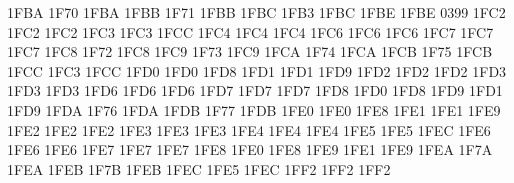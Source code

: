 \setcclcuc 1FBA 1F70 1FBA %
\setcclcuc 1FBB 1F71 1FBB %
\setcclcuc 1FBC 1FB3 1FBC %
\setcclcuc 1FBE 1FBE 0399 %
\setcclcuc 1FC2 1FC2 1FC2 %
\setcclcuc 1FC3 1FC3 1FCC %
\setcclcuc 1FC4 1FC4 1FC4 %
\setcclcuc 1FC6 1FC6 1FC6 %
\setcclcuc 1FC7 1FC7 1FC7 %
\setcclcuc 1FC8 1F72 1FC8 %
\setcclcuc 1FC9 1F73 1FC9 %
\setcclcuc 1FCA 1F74 1FCA %
\setcclcuc 1FCB 1F75 1FCB %
\setcclcuc 1FCC 1FC3 1FCC %
\setcclcuc 1FD0 1FD0 1FD8 %
\setcclcuc 1FD1 1FD1 1FD9 %
\setcclcuc 1FD2 1FD2 1FD2 %
\setcclcuc 1FD3 1FD3 1FD3 %
\setcclcuc 1FD6 1FD6 1FD6 %
\setcclcuc 1FD7 1FD7 1FD7 %
\setcclcuc 1FD8 1FD0 1FD8 %
\setcclcuc 1FD9 1FD1 1FD9 %
\setcclcuc 1FDA 1F76 1FDA %
\setcclcuc 1FDB 1F77 1FDB %
\setcclcuc 1FE0 1FE0 1FE8 %
\setcclcuc 1FE1 1FE1 1FE9 %
\setcclcuc 1FE2 1FE2 1FE2 %
\setcclcuc 1FE3 1FE3 1FE3 %
\setcclcuc 1FE4 1FE4 1FE4 %
\setcclcuc 1FE5 1FE5 1FEC %
\setcclcuc 1FE6 1FE6 1FE6 %
\setcclcuc 1FE7 1FE7 1FE7 %
\setcclcuc 1FE8 1FE0 1FE8 %
\setcclcuc 1FE9 1FE1 1FE9 %
\setcclcuc 1FEA 1F7A 1FEA %
\setcclcuc 1FEB 1F7B 1FEB %
\setcclcuc 1FEC 1FE5 1FEC %
\setcclcuc 1FF2 1FF2 1FF2 %
